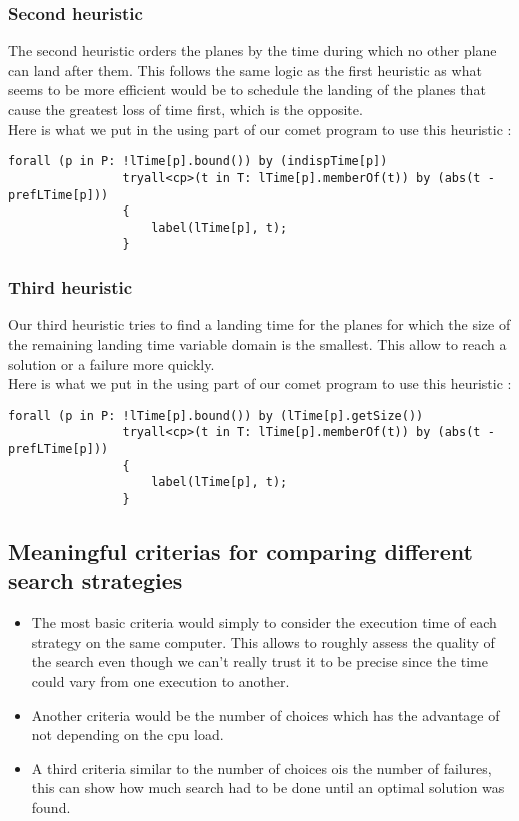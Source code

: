\documentclass{eplDoc}
\begin{document}
\subsubsection{Second heuristic}
The second heuristic orders the planes by the time during which no other plane can land after them. This follows the same logic as the first heuristic as what seems to be more efficient would be to schedule the landing of the planes that cause the greatest loss of time first, which is the opposite. \\ 
Here is what we put in the using part of our comet program to use this heuristic : 
\begin{lstlisting}
forall (p in P: !lTime[p].bound()) by (indispTime[p])
                tryall<cp>(t in T: lTime[p].memberOf(t)) by (abs(t - prefLTime[p]))
                {
                    label(lTime[p], t);
                } 
\end{lstlisting}
\subsubsection{Third heuristic}
Our third heuristic tries to find a landing time for the planes for which the size of the remaining landing time variable domain is the smallest. This allow to reach a solution or a failure more quickly. \\ 
Here is what we put in the using part of our comet program to use this heuristic : 
\begin{lstlisting}
forall (p in P: !lTime[p].bound()) by (lTime[p].getSize())
                tryall<cp>(t in T: lTime[p].memberOf(t)) by (abs(t - prefLTime[p]))
                {
                    label(lTime[p], t);
                } 
\end{lstlisting}

\subsection{Meaningful criterias for comparing different search strategies}

\begin{itemize}
	\item The most basic criteria would simply to consider the execution time of each strategy on the same computer. This allows to roughly assess the quality of the search even though we can't really trust it to be precise since the time could vary from one execution to another. 
	\item Another criteria would be the number of choices which has the advantage of not depending on the cpu load. 
	\item A third criteria similar to the number of choices ois the number of failures, this can show how much search had to be done until an optimal solution was found. 
	
	
\end{itemize}
\end{document}
